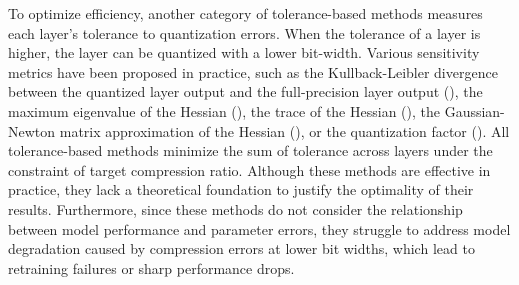 To optimize efficiency, another category of tolerance-based methods measures each layer's tolerance to quantization errors. When the tolerance of a layer is higher, the layer can be quantized with a lower bit-width. Various sensitivity metrics have been proposed in practice, such as the Kullback-Leibler divergence between the quantized layer output and the full-precision layer output (\cite{cai2020zeroq}), the maximum eigenvalue of the Hessian (\cite{2019HAWQ}), the trace of the Hessian (\cite{dong2019hawq, 2020HAWQV3}), the Gaussian-Newton matrix approximation of the Hessian (\cite{chen2021towards}), or the quantization factor (\cite{tang2022mixed}). All tolerance-based methods minimize the sum of tolerance across layers under the constraint of target compression ratio.
Although these methods are effective in practice, they lack a theoretical foundation to justify the optimality of their results. Furthermore, since these methods do not consider the relationship between model performance and parameter errors, they struggle to address model degradation caused by compression errors at lower bit widths, which lead to retraining failures or sharp performance drops.
\vspace{-0.4cm}